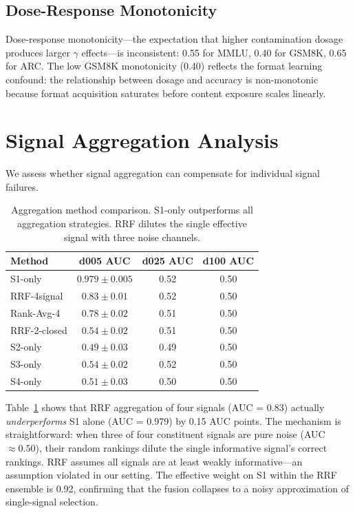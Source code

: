\documentclass[11pt]{article}
\begin{document}
\subsection{Dose-Response Monotonicity}
Dose-response monotonicity---the expectation that higher contamination dosage produces larger $\gamma$ effects---is inconsistent: 0.55 for MMLU, 0.40 for GSM8K, 0.65 for ARC.
The low GSM8K monotonicity (0.40) reflects the format learning confound: the relationship between dosage and accuracy is non-monotonic because format acquisition saturates before content exposure scales linearly.


\section{Signal Aggregation Analysis}
\label{sec:rrf}

We assess whether signal aggregation can compensate for individual signal failures.

\begin{table}[t]
\centering
\caption{Aggregation method comparison.
S1-only outperforms all aggregation strategies.
RRF dilutes the single effective signal with three noise channels.}
\label{tab:rrf}
\small
\begin{tabular}{lccc}
\toprule
Method & d005 AUC & d025 AUC & d100 AUC \\
\midrule
S1-only & $0.979 \pm 0.005$ & 0.52 & 0.50 \\
RRF-4signal & $0.83 \pm 0.01$ & 0.52 & 0.50 \\
Rank-Avg-4 & $0.78 \pm 0.02$ & 0.51 & 0.50 \\
RRF-2-closed & $0.54 \pm 0.02$ & 0.51 & 0.50 \\
S2-only & $0.49 \pm 0.03$ & 0.49 & 0.50 \\
S3-only & $0.54 \pm 0.02$ & 0.52 & 0.50 \\
S4-only & $0.51 \pm 0.03$ & 0.50 & 0.50 \\
\bottomrule
\end{tabular}
\end{table}

Table~\ref{tab:rrf} shows that RRF aggregation of four signals (AUC = 0.83) actually \emph{underperforms} S1 alone (AUC = 0.979) by 0.15 AUC points.
The mechanism is straightforward: when three of four constituent signals are pure noise (AUC $\approx 0.50$), their random rankings dilute the single informative signal's correct rankings.
RRF assumes all signals are at least weakly informative---an assumption violated in our setting.
The effective weight on S1 within the RRF ensemble is 0.92, confirming that the fusion collapses to a noisy approximation of single-signal selection.
\end{document}
